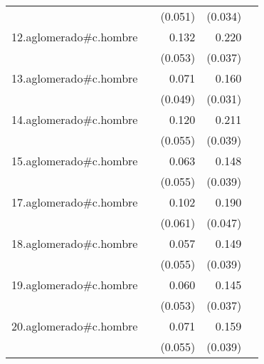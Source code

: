 {\begin{longtable}{l*{4}{D{.}{.}{-1}}}
            &                     &     (0.051)         &     (0.034)         &                     \\
\addlinespace
12.aglomerado#c.hombre&                     &       0.132\sym{*}  &       0.220\sym{***}&                     \\
            &                     &     (0.053)         &     (0.037)         &                     \\
\addlinespace
13.aglomerado#c.hombre&                     &       0.071         &       0.160\sym{***}&                     \\
            &                     &     (0.049)         &     (0.031)         &                     \\
\addlinespace
14.aglomerado#c.hombre&                     &       0.120\sym{*}  &       0.211\sym{***}&                     \\
            &                     &     (0.055)         &     (0.039)         &                     \\
\addlinespace
15.aglomerado#c.hombre&                     &       0.063         &       0.148\sym{***}&                     \\
            &                     &     (0.055)         &     (0.039)         &                     \\
\addlinespace
17.aglomerado#c.hombre&                     &       0.102         &       0.190\sym{***}&                     \\
            &                     &     (0.061)         &     (0.047)         &                     \\
\addlinespace
18.aglomerado#c.hombre&                     &       0.057         &       0.149\sym{***}&                     \\
            &                     &     (0.055)         &     (0.039)         &                     \\
\addlinespace
19.aglomerado#c.hombre&                     &       0.060         &       0.145\sym{***}&                     \\
            &                     &     (0.053)         &     (0.037)         &                     \\
\addlinespace
20.aglomerado#c.hombre&                     &       0.071         &       0.159\sym{***}&                     \\
            &                     &     (0.055)         &     (0.039)         &                     \\

\end{longtable}}

